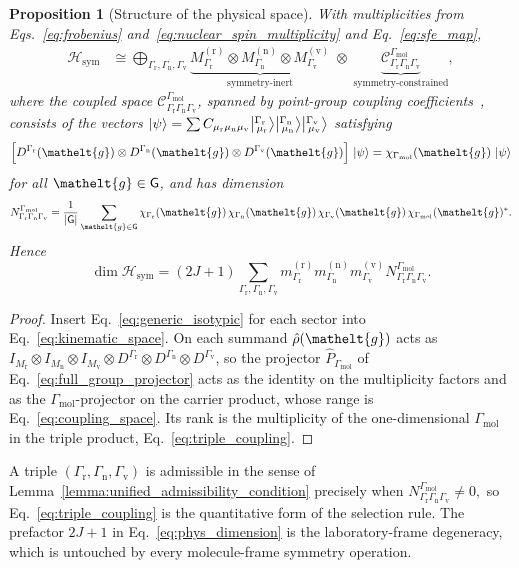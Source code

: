 \documentclass[
  reprint,
  aps,
  prx,
  superscriptaddress,
  amsmath,
  amssymb,
  longbibliography
]{revtex4-2}
\newcommand{\eltfont}[1]{{\let\sigma\eltsigma\mathelt{#1}}}
\newcommand{\grp}[1]{\mathsf{#1}}
\newcommand{\elt}[1]{\eltfont{#1}}
\newcommand{\repD}[1]{D^{#1}}
\newcommand{\irchar}[1]{\chi_{#1}}
\newcommand{\irket}[2]{\bigl\lvert{}^{#1}_{\,#2}\bigr\rangle}
\newcommand{\gel}{\elt{g}}             %
\newtheorem{proposition}{Proposition}
\providecommand{\Gmol}{\Gamma_{\mathrm{mol}}}
\providecommand{\Grot}{\Gamma_{\mathrm{r}}}
\providecommand{\Gvib}{\Gamma_{\mathrm{v}}}
\providecommand{\Gspin}{\Gamma_{\mathrm{n}}}
\begin{document}
\begin{proposition}[Structure of the physical space]
\label{prop:structure}
With multiplicities from Eqs.~\eqref{eq:frobenius} and~\eqref{eq:nuclear_spin_multiplicity} and Eq.~\eqref{eq:sfe_map},
\begin{align}
\mathcal H_{\mathrm{sym}}
&\cong
\bigoplus_{\Grot,\Gspin,\Gvib}
\underbrace{
M^{(\mathrm r)}_{\Grot}
\otimes
M^{(\mathrm n)}_{\Gspin}
\otimes
M^{(\mathrm v)}_{\Gvib}
}_{\text{symmetry-inert}}
\;\otimes\;
\underbrace{
\mathcal C^{\Gmol}_{\Grot\Gspin\Gvib}
}_{\text{symmetry-constrained}},
\label{eq:coupled_decomposition}
\end{align}
where the coupled space $\mathcal C^{\Gmol}_{\Grot\Gspin\Gvib}$, spanned by point-group coupling coefficients~\cite{Griffith1962, Butler1981, Rey2019}, consists of the vectors $\ket{\psi}=\sum C_{\mu_{\mathrm r}\mu_{\mathrm n}\mu_{\mathrm v}}\irket{\Grot}{\mu_{\mathrm r}}\irket{\Gspin}{\mu_{\mathrm n}}\irket{\Gvib}{\mu_{\mathrm v}}$ satisfying
\begin{equation}
\Bigl[
\repD{\Grot}(\gel)\otimes
\repD{\Gspin}(\gel)\otimes
\repD{\Gvib}(\gel)
\Bigr]\,
\ket{\psi}
=
\irchar{\Gmol}(\gel)\,\ket{\psi}
\label{eq:coupling_space}
\end{equation}
for all $\gel\in\grp{G}$, and has dimension
\begin{equation}
N^{\Gmol}_{\Grot\Gspin\Gvib}
=
\frac{1}{|\grp{G}|}
\sum_{\gel\in \grp{G}}
\irchar{\Grot}(\gel)\,
\irchar{\Gspin}(\gel)\,
\irchar{\Gvib}(\gel)\,
\irchar{\Gmol}(\gel)^{*}.
\label{eq:triple_coupling}
\end{equation}
Hence
\begin{equation}
\dim\mathcal H_{\mathrm{sym}}
=
(2J+1)
\!\!\sum_{\Grot,\Gspin,\Gvib}\!\!
m^{(\mathrm r)}_{\Grot}
m^{(\mathrm n)}_{\Gspin}
m^{(\mathrm v)}_{\Gvib}
N^{\Gmol}_{\Grot\Gspin\Gvib} .
\label{eq:phys_dimension}
\end{equation}
\end{proposition}

\begin{proof}
Insert Eq.~\eqref{eq:generic_isotypic} for each sector into Eq.~\eqref{eq:kinematic_space}. On each summand $\hat\rho(\gel)$ acts as $I_{M_{\mathrm r}}\otimes I_{M_{\mathrm n}}\otimes I_{M_{\mathrm v}}\otimes \repD{\Grot}\otimes \repD{\Gspin}\otimes \repD{\Gvib}$, so the projector $\hat P_{\Gmol}$ of Eq.~\eqref{eq:full_group_projector} acts as the identity on the multiplicity factors and as the $\Gmol$-projector on the carrier product, whose range is Eq.~\eqref{eq:coupling_space}. Its rank is the multiplicity of the one-dimensional $\Gmol$ in the triple product, Eq.~\eqref{eq:triple_coupling}.
\end{proof}
A triple \((\Grot,\Gspin,\Gvib)\) is admissible in the sense of Lemma~\ref{lemma:unified_admissibility_condition} precisely when
\(
N^{\Gmol}_{\Grot\Gspin\Gvib}\neq0,
\)
so Eq.~\eqref{eq:triple_coupling} is the quantitative form of the selection rule. The prefactor \(2J+1\) in Eq.~\eqref{eq:phys_dimension} is the laboratory-frame degeneracy, which is untouched by every molecule-frame symmetry operation.
\end{document}
